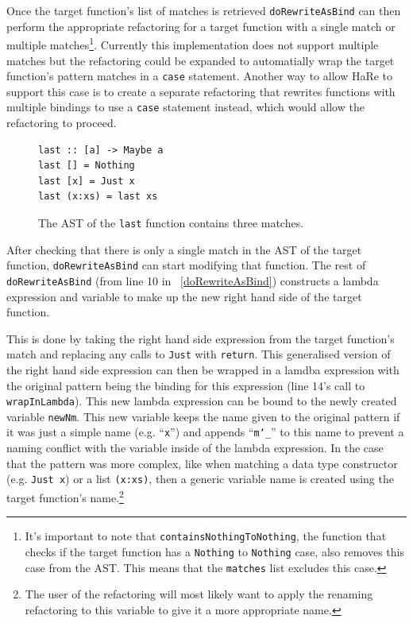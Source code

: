 Once the target function's list of matches is retrieved \texttt{doRewriteAsBind} can then perform the appropriate refactoring for a target function with a single match or multiple matches\footnote{It's important to note that \texttt{containsNothingToNothing}, the function that checks if the target function has a \texttt{Nothing} to \texttt{Nothing} case, also removes this case from the AST. This means that the \texttt{matches} list excludes this case.}. Currently this implementation does not support multiple matches but the refactoring could be expanded to automatially wrap the target function's pattern matches in a \texttt{case} statement. Another way to allow HaRe to support this case is to create a separate refactoring that rewrites functions with multiple bindings to use a \texttt{case} statement instead, which would allow the refactoring to proceed.

\begin{figure}[t]
\begin{lstlisting}
last :: [a] -> Maybe a
last [] = Nothing
last [x] = Just x
last (x:xs) = last xs
\end{lstlisting}
\caption{The AST of the \texttt{last} function contains three matches.}
\label{matchExample}
\end{figure}

After checking that there is only a single match in the AST of the target function, \texttt{doRewriteAsBind} can start modifying that function. The rest of \texttt{doRewriteAsBind} (from line 10 in \DIFdelbegin {}\DIFdelend \DIFaddbegin {}\DIFaddend ~\ref{doRewriteAsBind}) constructs a lambda expression and variable to make up the new right hand side of the target function. 

This is done by taking the right hand side expression from the target function's match and replacing any calls to \texttt{Just} with \texttt{return}. This generalised version of the right hand side expression can then be wrapped in a lamdba expression with the original pattern being the binding for this expression (line 14's call to \texttt{wrapInLambda}). This new lambda expression can be bound to the newly created variable \texttt{newNm}. This new variable keeps the name given to the original pattern if it was just a simple name (e.g. ``\texttt{x}'') and appends ``\texttt{m\char`_}'' to this name to prevent a naming conflict with the variable inside of the lambda expression. In the case that the pattern was more complex, like when matching a data type constructor (e.g. \texttt{Just x}) or a list \texttt{(x:xs)}, then a generic variable name is created using the target function's name.\footnote{The user of the refactoring will most likely want to apply the renaming refactoring to this variable to give it a more appropriate name.}

